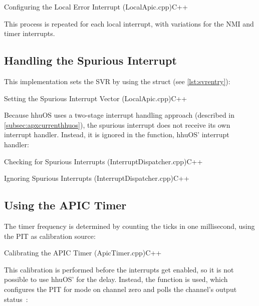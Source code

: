 \begin{codeblock}{Configuring the Local Error Interrupt (LocalApic.cpp)}{C++}
\end{codeblock}

This process is repeated for each local interrupt, with variations for the NMI and timer interrupts.

\subsection{Handling the Spurious Interrupt}
\label{subsec:apxsvr}

This implementation sets the SVR by using the  struct (see \autoref{lst:svrentry}):

\begin{codeblock}{Setting the Spurious Interrupt Vector (LocalApic.cpp)}{C++}
\end{codeblock}

Because hhuOS uses a two-stage interrupt handling approach (described in \autoref{subsec:apxcurrenthhuos}), the spurious interrupt does not receive its own interrupt handler.
Instead, it is ignored in the  function, hhuOS'  interrupt handler:

\begin{codeblock}{Checking for Spurious Interrupts (InterruptDispatcher.cpp)}{C++}
\end{codeblock}

\begin{codeblock}{Ignoring Spurious Interrupts (InterruptDispatcher.cpp)}{C++}
\end{codeblock}

\subsection{Using the APIC Timer}
\label{subsec:apxapictimer}

The timer frequency is determined by counting the ticks in one millisecond, using the PIT as calibration source:

\begin{codeblock}{Calibrating the APIC Timer (ApicTimer.cpp)}{C++}
\end{codeblock}

This calibration is performed before the interrupts get enabled, so it is not possible to use hhuOS'  for the delay.
Instead, the  function is used, which configures the PIT for mode  on channel zero and polls the channel's output status~\autocite{pit}:

